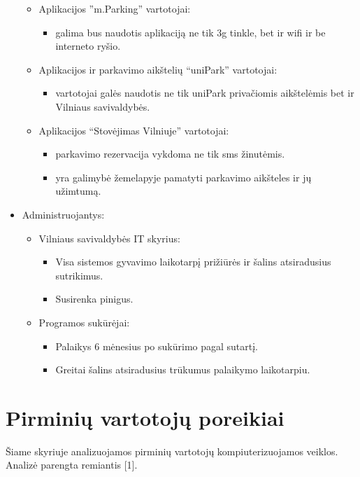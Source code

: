 \documentclass{VUMIFPSkursinis}
\begin{document}
\begin{itemize}[label={}]
\begin{itemize}[label={$\bullet$}]
\begin{itemize}[label={--}]
				\end{itemize}					
			\item Aplikacijos ”m.Parking” vartotojai:
				\begin{itemize}[label={--}]
					\item galima bus naudotis aplikaciją ne tik 3g tinkle, bet ir wifi ir be interneto ryšio.
				\end{itemize}
			\item Aplikacijos ir parkavimo aikštelių “uniPark” vartotojai:
				\begin{itemize}[label={--}]
					\item vartotojai galės naudotis ne tik uniPark privačiomis aikštelėmis bet ir Vilniaus savivaldybės.
				\end{itemize}
			\item Aplikacijos “Stovėjimas Vilniuje” vartotojai:
				\begin{itemize}[label={--}]
					\item parkavimo rezervacija vykdoma ne tik sms žinutėmis.
					\item yra galimybė žemelapyje pamatyti parkavimo aikšteles ir jų užimtumą.
				\end{itemize}
		\end{itemize}
	\item Administruojantys:
		\begin{itemize}[label={$\bullet$}]
			\item Vilniaus savivaldybės IT skyrius:
				\begin{itemize}[label={--}]
					\item Visa sistemos gyvavimo laikotarpį prižiūrės ir šalins atsiradusius sutrikimus.
					\item Susirenka pinigus.
				\end{itemize}					
			\item Programos sukūrėjai:
				\begin{itemize}[label={--}]
					\item Palaikys 6 mėnesius po sukūrimo pagal sutartį.
					\item Greitai šalins atsiradusius trūkumus palaikymo laikotarpiu.
				\end{itemize}
		\end{itemize}
\end{itemize}

\section{Pirminių vartotojų poreikiai}
Šiame skyriuje analizuojamos pirminių vartotojų kompiuterizuojamos veiklos. Analizė parengta remiantis [1].
\end{document}

